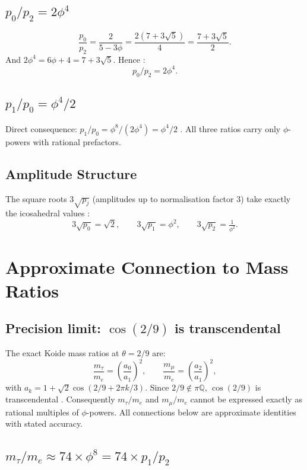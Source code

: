 \subsection{$p_0/p_2 = 2\phi^4$}

\[
  \frac{p_0}{p_2} = \frac{2}{5-3\phi} = \frac{2(7+3\sqrt5)}{4} = \frac{7+3\sqrt5}{2}.
\]
And $2\phi^4 = 6\phi+4 = 7+3\sqrt5$. Hence \BM:
\[
  \boxed{p_0/p_2 = 2\phi^4.}
\]

\subsection{$p_1/p_0 = \phi^4/2$}

Direct consequence: $p_1/p_0 = \phi^8/(2\phi^4) = \phi^4/2$ \BM.
All three ratios carry only $\phi$-powers with rational prefactors.

\subsection{Amplitude Structure}

The square roots $3\sqrt{p_j}$ (amplitudes up to normalisation factor 3)
take exactly the icosahedral values \BM:
\[
  3\sqrt{p_0}=\sqrt2, \qquad 3\sqrt{p_1}=\phi^2, \qquad 3\sqrt{p_2}=\tfrac{1}{\phi^2}.
\]

\section{Approximate Connection to Mass Ratios}

\subsection{Precision limit: $\cos(2/9)$ is transcendental}

The exact Koide mass ratios at $\theta=2/9$ are:
\[
  \frac{m_\tau}{m_e} = \left(\frac{a_0}{a_1}\right)^2, \qquad
  \frac{m_\mu}{m_e} = \left(\frac{a_2}{a_1}\right)^2,
\]
with $a_k = 1+\sqrt2\cos(2/9+2\pi k/3)$. Since $2/9\notin\pi\mathbb{Q}$,
$\cos(2/9)$ is transcendental \EM. Consequently $m_\tau/m_e$ and $m_\mu/m_e$
cannot be expressed exactly as rational multiples of $\phi$-powers. All
connections below are approximate identities with stated accuracy.

\subsection{$m_\tau/m_e \approx 74\times\phi^8 = 74\times p_1/p_2$}

